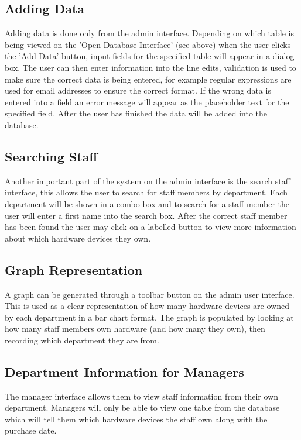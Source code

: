 \subsection{Adding Data}

Adding data is done only from the admin interface. Depending on which table is being viewed on the 'Open Database Interface' (see above) when the user clicks the 'Add Data' button, input fields for the specified table will appear in a dialog box. The user can then enter information into the line edits, validation is used to make sure the correct data is being entered, for example regular expressions are used for email addresses to ensure the correct format. If the wrong data is entered into a field an error message will appear as the placeholder text for the specified field. After the user has finished the data will be added into the database.

\subsection{Searching Staff}

Another important part of the system on the admin interface is the search staff interface, this allows the user to search for staff members by department. Each department will be shown in a combo box and to search for a staff member the user will enter a first name into the search box. After the correct staff member has been found the user may click on a labelled button to view more information about which hardware devices they own.

\subsection{Graph Representation}

A graph can be generated through a toolbar button on the admin user interface. This is used as a clear representation of how many hardware devices are owned by each department in a bar chart format. The graph is populated by looking at how many staff members own hardware (and how many they own), then recording which department they are from.

\subsection{Department Information for Managers}

The manager interface allows them to view staff information from their own department. Managers will only be able to view one table from the database which will tell them which hardware devices the staff own along with the purchase date. 

